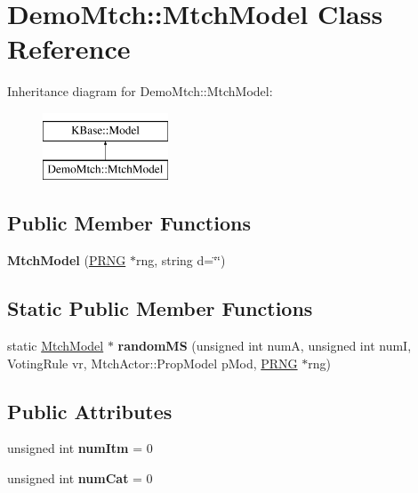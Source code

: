 \hypertarget{class_demo_mtch_1_1_mtch_model}{\section{Demo\-Mtch\-:\-:Mtch\-Model Class Reference}
\label{class_demo_mtch_1_1_mtch_model}
}
Inheritance diagram for Demo\-Mtch\-:\-:Mtch\-Model\-:\begin{figure}[H]
\begin{center}
\leavevmode
\includegraphics[height=2.000000cm]{class_demo_mtch_1_1_mtch_model}
\end{center}
\end{figure}
\subsection*{Public Member Functions}
\begin{DoxyCompactItemize}
\item 
\hypertarget{class_demo_mtch_1_1_mtch_model_ab3b0b8b87f85ef9043df8283d805b56e}{{\bfseries Mtch\-Model} (\hyperlink{class_k_base_1_1_p_r_n_g}{P\-R\-N\-G} $\ast$rng, string d=\char`\"{}\char`\"{})}\label{class_demo_mtch_1_1_mtch_model_ab3b0b8b87f85ef9043df8283d805b56e}

\end{DoxyCompactItemize}
\subsection*{Static Public Member Functions}
\begin{DoxyCompactItemize}
\item 
\hypertarget{class_demo_mtch_1_1_mtch_model_a23dd4a323f33e41049389e7b13a72f8c}{static \hyperlink{class_demo_mtch_1_1_mtch_model}{Mtch\-Model} $\ast$ {\bfseries random\-M\-S} (unsigned int num\-A, unsigned int num\-I, Voting\-Rule vr, Mtch\-Actor\-::\-Prop\-Model p\-Mod, \hyperlink{class_k_base_1_1_p_r_n_g}{P\-R\-N\-G} $\ast$rng)}\label{class_demo_mtch_1_1_mtch_model_a23dd4a323f33e41049389e7b13a72f8c}

\end{DoxyCompactItemize}
\subsection*{Public Attributes}
\begin{DoxyCompactItemize}
\item 
\hypertarget{class_demo_mtch_1_1_mtch_model_ad2e5623acf2306506fa6435d784701fc}{unsigned int {\bfseries num\-Itm} = 0}\label{class_demo_mtch_1_1_mtch_model_ad2e5623acf2306506fa6435d784701fc}

\item 
\hypertarget{class_demo_mtch_1_1_mtch_model_a90409cdad9c9af1c1dc8f4462fb73c67}{unsigned int {\bfseries num\-Cat} = 0}\label{class_demo_mtch_1_1_mtch_model_a90409cdad9c9af1c1dc8f4462fb73c67}

\end{DoxyCompactItemize}
